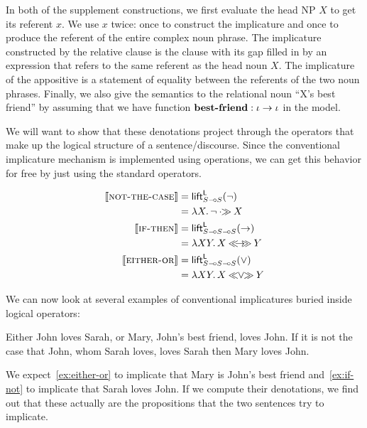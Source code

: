 In both of the supplement constructions, we first evaluate the head NP $X$
to get its referent $x$. We use $x$ twice: once to construct the
implicature and once to produce the referent of the entire complex noun
phrase. The implicature constructed by the relative clause is the clause
with its gap filled in by an expression that refers to the same referent as
the head noun $X$. The implicature of the appositive is a statement of
equality between the referents of the two noun phrases. Finally, we also
give the semantics to the relational noun ``X's best friend'' by assuming
that we have function $\textbf{best-friend} : \iota \to \iota$ in the model.

We will want to show that these denotations project through the operators
that make up the logical structure of a sentence/discourse. Since the
conventional implicature mechanism is implemented using operations, we can
get this behavior for free by just using the standard operators.

\begin{align*}
  \lex{not-the-case}{\liftl_{S \limp S}(\lnot)} \\
  &= \lam{X}{\lnot \apr X} \\
  \lex{if-then}{\liftl_{S \limp S \limp S}(\to)} \\
  &= \lam{X Y}{X \implr Y} \\
  \lex{either-or}{\liftl_{S \limp S \limp S}(\lor)} \\
  &= \lam{X Y}{X \orlr Y}
\end{align*}

We can now look at several examples of conventional implicatures buried
inside logical operators:

\begin{exe}
  \ex Either John loves Sarah, or Mary, John's best friend, loves John. \label{ex:either-or}
  \ex If it is not the case that John, whom Sarah loves, loves Sarah then Mary loves John. \label{ex:if-not}
\end{exe}

We expect~\eqref{ex:either-or} to implicate that Mary is John's best friend
and~\eqref{ex:if-not} to implicate that Sarah loves John. If we compute
their denotations, we find out that these actually are the propositions
that the two sentences try to implicate.

